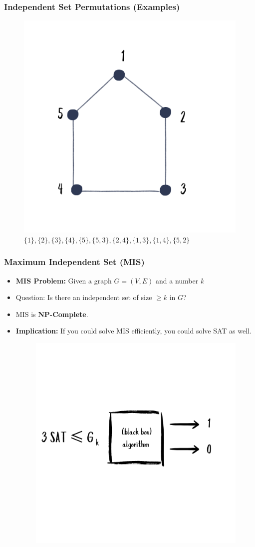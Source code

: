 \begin{frame}
  \frametitle{Independent Set Permutations (Examples)}
  
  \begin{figure}
    \centering
    \includegraphics[width=0.4\linewidth]{figures/lec/i3.png}
    \caption {$\{1\}, \{2\}, \{3\}, \{4\}, \{5\}, \{5,3\}, \{2,4\}, \{1,3\}, \{1,4\}, \{5,2\}$}
  \end{figure}
\end{frame}

\begin{frame}
    \frametitle{Maximum Independent Set (MIS)}
    \begin{itemize}
        \item \textbf{MIS Problem:} Given a graph $G = (V, E)$ and a number $k$
        \item Question: Is there an independent set of size $\geq k$ in $G$?
        \item MIS is \textbf{NP-Complete}.
        \item \textbf{Implication:} If you could solve MIS efficiently, you could solve SAT as well.
 \begin{figure}
    \centering
    \includegraphics[width=0.4\linewidth]{figures/lec/MIS.png}
  \end{figure}
    \end{itemize}
\end{frame}

